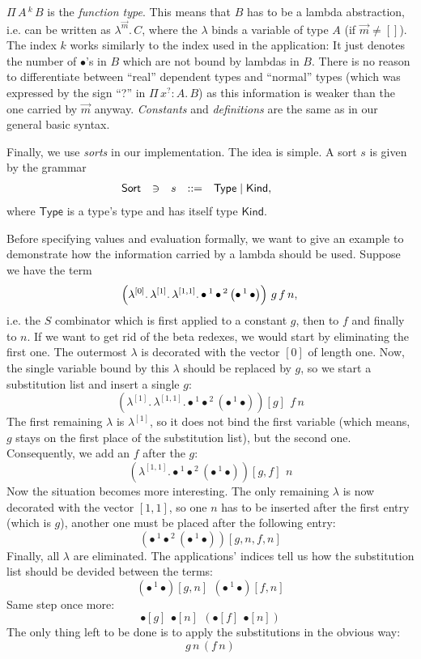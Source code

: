 \documentclass[12pt, a4paper, titlepage]{article}
\newcommand{\ovar}{\mathord{\bullet}}
\newcommand{\sspace}{\,}
\newcommand{\lspace}{\ \,}
\newcommand{\type}{\mathsf{Type}}
\newcommand{\kind}{\mathsf{Kind}}
\newcommand{\sort}{\mathsf{Sort}}
\newcommand{\la}{\lambda}
\newcommand{\emptyVec}{[]}
\newcommand{\ve}[1]{[#1]}
\newcommand{\PiA}[3]{\Pi \sspace #1:#2 . \sspace #3}
\newcommand{\oapp}[1]{\sspace ^{#1} \sspace}
\newcommand{\LaO}[2]{\la ^{#1} . \sspace #2}
\newcommand{\PiO}[3]{\Pi \sspace #1 \sspace ^{#2} \sspace #3}
\newcommand{\pa}[1]{\left( #1 \right)}
\begin{document}
$\PiO A k B$ is the \emph{function type}.
This means that $B$ has to be a lambda abstraction, i.e. can be written as $\LaO {\vec m} C$, where the $\la$ binds a variable of type $A$ (if $\vec m \not= \emptyVec$). The index $k$ works similarly to the index used in the application: It just denotes the number of $\ovar$'s in $B$ which are not bound by lambdas in $B$. There is no reason to differentiate between ``real'' dependent types and ``normal'' types (which was expressed by the sign ``?'' in $\PiA {x^?} A B$) as this information is weaker than the one carried by $\vec m$ anyway. \emph{Constants} and \emph{definitions} are the same as in our general basic syntax.

Finally, we use \emph{sorts} in our implementation. The idea is simple. A sort $s$ is given by the grammar
\[
\begin{array}{lllrll@{\qquad}}
\sort       & \ni & s & ::= & \type \mid \kind, &
\end{array}
\]
where $\type$ is a type's type and has itself type $\kind$.

Before specifying values and evaluation formally, we want to give an example to demonstrate how the information carried by a lambda should be used. Suppose we have the term
\[
\left(\LaO {\ve 0} {\LaO {\ve 1} {\LaO {\ve{1,1}} {\ovar \oapp 1 \ovar \oapp 2 {\pa{\ovar \oapp 1 \ovar}}}}}\right) \sspace g \sspace f \sspace n, \\ 
\]
i.e. the $S$ combinator which is first applied to a constant $g$, then to $f$ and finally to $n$. If we want to get rid of the beta redexes, we would start by eliminating the first one. The outermost $\la$ is decorated with the vector $\ve 0$ of length one. Now, the single variable bound by this $\la$ should be replaced by $g$, so we start a substitution list and insert a single $g$:
\[
\left(\LaO {\ve 1} {\LaO {\ve{1,1}} {\ovar \oapp 1 \ovar \oapp 2 {\pa{\ovar \oapp 1 \ovar}}}}\right) \left[ g \right] \lspace f \sspace n
\]
The first remaining $\la$ is $\la^{\ve 1}$, so it does not bind the first variable (which means, $g$ stays on the first place of the substitution list), but the second one. Consequently, we add an $f$ after the $g$:
\[
\left(\LaO {\ve{1,1}} {\ovar \oapp 1 \ovar \oapp 2 {\pa{\ovar \oapp 1 \ovar}}}\right)  \left[ g, f \right] \lspace n
\]
Now the situation becomes more interesting. The only remaining $\la$ is now decorated with the vector $\ve{1,1}$, so one $n$ has to be inserted after the first entry (which is $g$), another one must be placed after the following entry:
\[
\left(\ovar \oapp 1 \ovar \oapp 2 {\pa{\ovar \oapp 1 \ovar}}\right)  \left[ g, n, f, n \right]
\]
Finally, all $\la$ are eliminated. The applications' indices tell us how the substitution list should be devided between the terms:
\[
\left(\ovar \oapp 1 \ovar\right)\left[ g, n \right] \lspace \left(\ovar \oapp 1 \ovar\right) \left[ f, n \right]
\]
Same step once more:
\[
\ovar[g]  \lspace \ovar[n]  \lspace \left(\ovar[f]  \lspace \ovar[n]\right)
\]
The only thing left to be done is to apply the substitutions in the obvious way:
\[
g \sspace n  \sspace (f \sspace n)
\]
\end{document}
